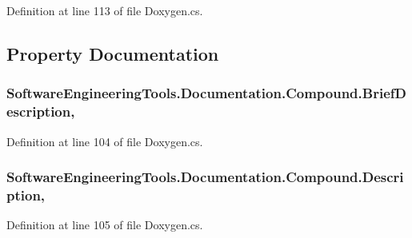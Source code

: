 Definition at line 113 of file Doxygen.\+cs.



\subsection{Property Documentation}
\hypertarget{class_software_engineering_tools_1_1_documentation_1_1_compound_a4bfcfda760068c85256a0723b5ce1921}{
\subsubsection[{Brief\+Description}]{ Software\+Engineering\+Tools.\+Documentation.\+Compound.\+Brief\+Description\hspace{0.3cm}{\ttfamily [get]}, {\ttfamily [set]}}}\label{class_software_engineering_tools_1_1_documentation_1_1_compound_a4bfcfda760068c85256a0723b5ce1921}


Definition at line 104 of file Doxygen.\+cs.

\hypertarget{class_software_engineering_tools_1_1_documentation_1_1_compound_a77ca6711192dfb78bcd2f0b513e74b2e}{
\subsubsection[{Description}]{ Software\+Engineering\+Tools.\+Documentation.\+Compound.\+Description\hspace{0.3cm}{\ttfamily [get]}, {\ttfamily [set]}}}\label{class_software_engineering_tools_1_1_documentation_1_1_compound_a77ca6711192dfb78bcd2f0b513e74b2e}


Definition at line 105 of file Doxygen.\+cs.

